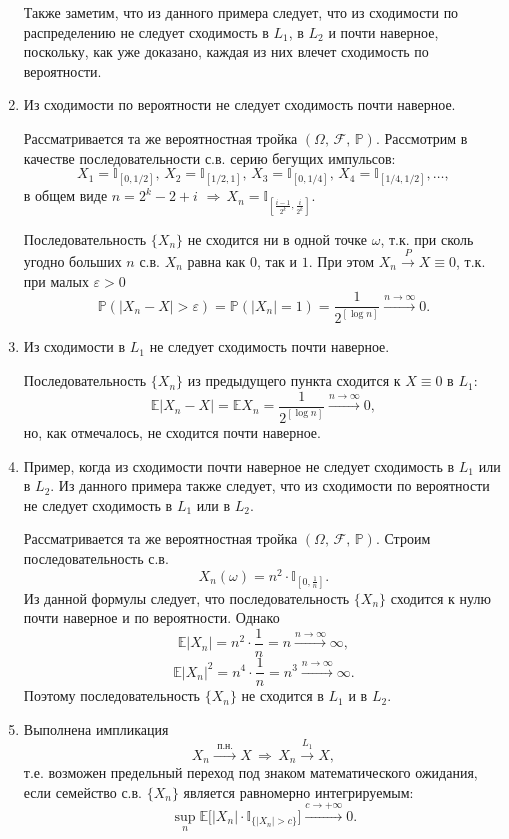 \begin{solution}
\begin{enumerate}
Также заметим, что из данного примера следует, что из сходимости по распределению не следует сходимость в $L_1$, в $L_2$ 
и почти наверное, поскольку, как уже доказано, каждая из них влечет сходимость по вероятности. 

\item Из сходимости по вероятности не следует сходимость почти наверное. 

Рассматривается та же вероятностная тройка $(\Omega,\, {\mathcal F},\, {\mathbb P})$. 
Рассмотрим в качестве последовательности с.в. серию бегущих импульсов: 
$$
X_1={\mathbb I}_{[0,1/2]},\, X_2={\mathbb I}_{[1/2,1]},\, X_3={\mathbb I}_{[0,1/4]},\, X_4={\mathbb I}_{[1/4,1/2]}, \ldots, 
$$
в общем виде $n=2^k-2+i$ $\Rightarrow\, X_n={\mathbb I}_{[\frac{i-1}{2^k},\frac{i}{2^k}]}$. 

Последовательность $\{ X_n\}$ не сходится ни в одной точке $\omega$, т.к. при сколь угодно больших $n$ с.в. $X_n$ 
равна как $0$, так и $1$. При этом $X_n\xrightarrow{P}X\equiv 0$, т.к. при малых $\varepsilon>0$ 
$$
{\mathbb P}(|X_n-X|>\varepsilon)={\mathbb P}(|X_n|=1)=\frac{1}{2^{[\log n]}}\xrightarrow{n\to\infty} 0 . 
$$

\item Из сходимости в $L_1$ не следует сходимость почти наверное. 

Последовательность $\{ X_n\}$ из предыдущего пункта сходится к $X\equiv 0$ в $L_1$: 
$$
{\mathbb E}|X_n-X|={\mathbb E}X_n=\frac{1}{2^{[\log n]}}\xrightarrow{n\to\infty} 0 , 
$$
но, как отмечалось, не сходится почти наверное. 

\item Пример, когда из сходимости почти наверное не следует сходимость в $L_1$ или в $L_2$. Из данного примера также 
следует, что из сходимости по вероятности не следует сходимость в $L_1$ или в $L_2$. 

Рассматривается та же вероятностная тройка $(\Omega,\, {\mathcal F},\, {\mathbb P})$. Строим последовательность с.в. 
$$
X_n(\omega)=n^2 \cdot {\mathbb I}_{[0,\frac{1}{n}]} . 
$$
Из данной формулы следует, что последовательность $\{ X_n\}$ сходится к нулю почти наверное и по вероятности. Однако 
$$
{\mathbb E}|X_n|=n^2\cdot\frac{1}{n}=n \xrightarrow{n\to\infty} \infty , 
$$
$$
{\mathbb E}|X_n|^2=n^4\cdot\frac{1}{n}=n^3 \xrightarrow{n\to\infty} \infty . 
$$
Поэтому последовательность $\{ X_n\}$ не сходится в $L_1$ и в $L_2$. 

\item Выполнена импликация 
$$
X_n\xrightarrow{\text{ п.н. }}X  \, \Rightarrow\, X_n\xrightarrow{L_1}X , 
$$
т.е. возможен предельный переход под знаком математического ожидания, если семейство с.в. $\{ X_n\}$ является равномерно интегрируемым: 
$$
\sup\limits_n {\mathbb E}\bigl[ |X_n|\cdot {\mathbb I}_{\{ |X_n|>c\}} \bigr]\xrightarrow{c\to +\infty}0 . 
$$


\end{enumerate}
\end{solution}
